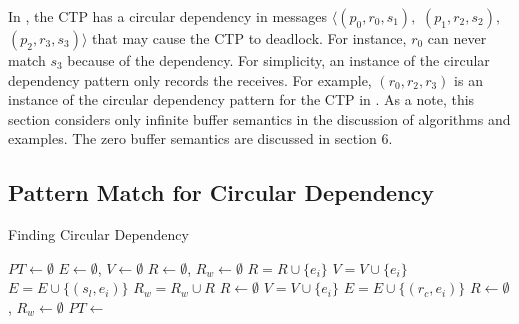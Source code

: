 In , the CTP has a circular dependency in messages $\langle(p_0, \mathit{r_{0}}, \mathit{s_{1}}),$ $(p_1, \mathit{r_{2}}, \mathit{s_{2}}),$ $(p_2, \mathit{r_{3}}, \mathit{s_{3}})\rangle$ that may cause the CTP to deadlock. For instance, $\mathit{r_{0}}$ can never match $\mathit{s_{3}}$ because of the dependency. For simplicity, an instance of the circular dependency pattern only records the receives. For example, $(\mathit{r_{0}}, \mathit{r_{2}}, \mathit{r_{3}})$ is an instance of the circular dependency pattern for the CTP in . As a note, this section considers only infinite buffer semantics in the discussion of algorithms and examples. The zero buffer semantics are discussed in section 6.


\subsection{Pattern Match for Circular Dependency}

\begin{algorithm}
\caption{Finding Circular Dependency}\label{algo:circular}
\begin{algorithmic}[1]
\State $\mathit{PT} \gets \emptyset$
\State $\mathit{E} \gets \emptyset$, $\mathit{V} \gets \emptyset$
\State $\mathit{R} \gets \emptyset$, $\mathit{R_w} \gets \emptyset$
\State $\mathit{R} = \mathit{R} \cup \{\mathit{e_i}\}$
\State $\mathit{V} = \mathit{V} \cup \{\mathit{e_i}\}$
 
\State $\mathit{E} = \mathit{E} \cup \{(\mathit{s_l},\mathit{e_i})\}$  
\EndFor
\EndIf
{}
\State $\mathit{R_w} = \mathit{R_w} \cup \mathit{R}$
\State $\mathit{R} \gets \emptyset$ 
\EndIf
{}
\State $\mathit{V} = \mathit{V} \cup \{\mathit{e_i}\}$
  
\State $\mathit{E} = \mathit{E} \cup \{(\mathit{r_c},\mathit{e_i})\}$
\EndFor
\EndIf
\EndFor
\State $\mathit{R} \gets \emptyset$, $\mathit{R_w} \gets \emptyset$
\EndFor
\State $\mathit{PT} \gets$ 
\end{algorithmic}
\end{algorithm}

